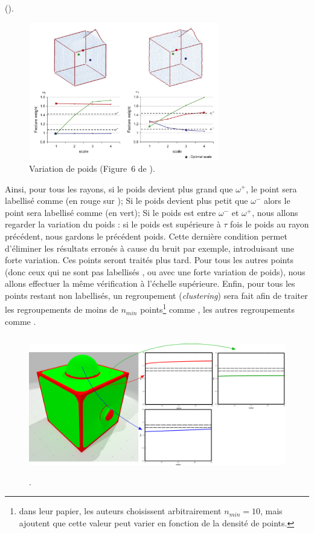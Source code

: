 ().
%
\begin{figure}[ht]{
    \begin{center}
    \includegraphics[height=6cm]{images/Feature/Tensor_weight}
    \end{center}}
    \caption[Variation de poids.]{Variation de poids (Figure~6 de \cite{Park2012}).
      \label{fig:tensor-weight}}
\end{figure}
%
Ainsi, pour tous les rayons, si le poids devient plus grand que $\omega^+$, le
point sera labellisé comme \Feature (en rouge sur
); Si le poids devient plus petit que
$\omega^-$ alors le point sera labellisé comme \NonFeature (en vert); Si le
poids est entre $\omega^-$ et $\omega^+$, nous allons regarder la variation du
poids : si le poids est supérieure à $\tau$ fois le poids au rayon précédent,
nous gardons le précédent poids. Cette dernière condition permet d'éliminer les
résultats erronés à cause du bruit par exemple, introduisant une forte
variation. Ces points seront traités plus tard. Pour tous les autres points
(donc ceux qui ne sont pas labellisés \Feature, \NonFeature ou avec une forte
variation de poids), nous allons effectuer la même vérification à l'échelle
supérieure. Enfin, pour tous les points restant non labellisés, un regroupement
(\emph{clustering}) sera fait afin de traiter les regroupements de moins de
$n_{min}$ points\footnote{dans leur papier, les auteurs choisissent
arbitrairement $n_{min}=10$, mais ajoutent que cette valeur peut varier en
fonction de la densité de points.} comme \NonFeature, les autres regroupements
comme \Feature.
%
\begin{figure}[ht]{
  \begin{center}
    \includegraphics[height=6cm]{figures/CubeSpherePlotTensor}
  \end{center}}
    \caption[.]{.
    \label{fig:tensor-cubesphere}}
\end{figure}
